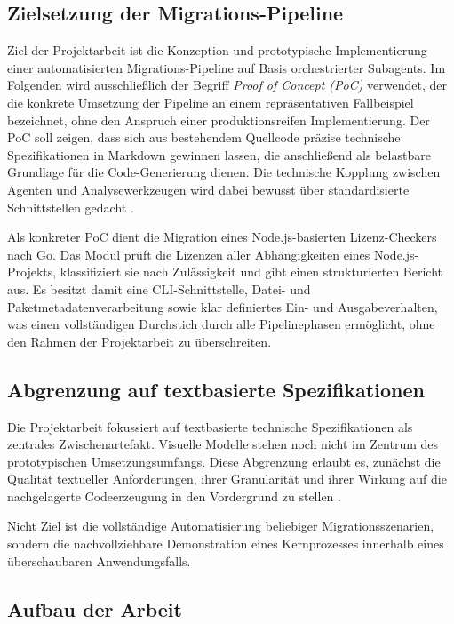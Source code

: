 \subsection{Zielsetzung der Migrations-Pipeline}

Ziel der Projektarbeit ist die Konzeption und prototypische Implementierung einer automatisierten Migrations-Pipeline auf Basis orchestrierter Subagents. Im Folgenden wird ausschließlich der Begriff \emph{Proof of Concept (PoC)} verwendet, der die konkrete Umsetzung der Pipeline an einem repräsentativen Fallbeispiel bezeichnet, ohne den Anspruch einer produktionsreifen Implementierung. Der PoC soll zeigen, dass sich aus bestehendem Quellcode präzise technische Spezifikationen in Markdown gewinnen lassen, die anschließend als belastbare Grundlage für die Code-Generierung dienen. Die technische Kopplung zwischen Agenten und Analysewerkzeugen wird dabei bewusst über standardisierte Schnittstellen gedacht \parencite{mcpdocs}.

Als konkreter PoC dient die Migration eines Node.js-basierten Lizenz-Checkers nach Go. Das Modul prüft die Lizenzen aller Abhängigkeiten eines Node.js-Projekts, klassifiziert sie nach Zulässigkeit und gibt einen strukturierten Bericht aus. Es besitzt damit eine CLI-Schnittstelle, Datei- und Paketmetadatenverarbeitung sowie klar definiertes Ein- und Ausgabeverhalten, was einen vollständigen Durchstich durch alle Pipelinephasen ermöglicht, ohne den Rahmen der Projektarbeit zu überschreiten.

\subsection{Abgrenzung auf textbasierte Spezifikationen}

Die Projektarbeit fokussiert auf textbasierte technische Spezifikationen als zentrales Zwischenartefakt. Visuelle Modelle stehen noch nicht im Zentrum des prototypischen Umsetzungsumfangs. Diese Abgrenzung erlaubt es, zunächst die Qualität textueller Anforderungen, ihrer Granularität und ihrer Wirkung auf die nachgelagerte Codeerzeugung in den Vordergrund zu stellen \parencite{midolo2026promptguidelines,korn2026reportingprompting}.

Nicht Ziel ist die vollständige Automatisierung beliebiger Migrationsszenarien, sondern die nachvollziehbare Demonstration eines Kernprozesses innerhalb eines überschaubaren Anwendungsfalls.

\subsection{Aufbau der Arbeit}


